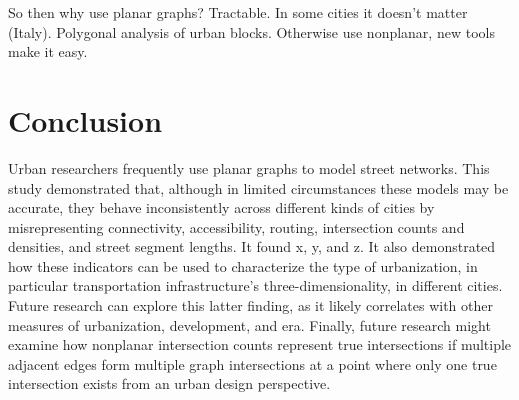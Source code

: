 \documentclass[Afour,sageh,times]{sagej}
\begin{document}
So then why use planar graphs? Tractable. In some cities it doesn't matter (Italy). Polygonal analysis of urban blocks. Otherwise use nonplanar, new tools make it easy.


\section{Conclusion}

Urban researchers frequently use planar graphs to model street networks. This study demonstrated that, although in limited circumstances these models may be accurate, they behave inconsistently across different kinds of cities by misrepresenting connectivity, accessibility, routing, intersection counts and densities, and street segment lengths. It found x, y, and z. It also demonstrated how these indicators can be used to characterize the type of urbanization, in particular transportation infrastructure's three-dimensionality, in different cities. Future research can explore this latter finding, as it likely correlates with other measures of urbanization, development, and era. Finally, future research might examine how nonplanar intersection counts represent true intersections if multiple adjacent edges form multiple graph intersections at a point where only one true intersection exists from an urban design perspective.




\end{document}
